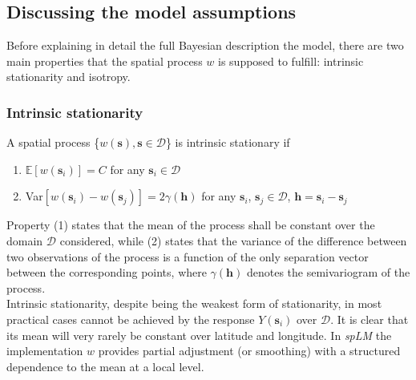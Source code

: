 \documentclass[12pt]{article}
\begin{document}
	\subsection{Discussing the model assumptions}

Before explaining in detail the full Bayesian description the model, there are two main properties that the spatial process $w$ is supposed to fulfill: intrinsic stationarity and isotropy.
	
	\subsubsection{Intrinsic stationarity}
	A spatial process \{$w(\boldsymbol{s}), \boldsymbol{s} \in \mathcal{D}$\} is intrinsic stationary if
	\begin{enumerate}[label=(\arabic*)]
		\item $\mathbb{E}[w(\boldsymbol{s}_i)]=C$ \hspace{5 mm} for any $\boldsymbol{s}_i \in \mathcal{D}$
		\item Var$[w(\boldsymbol{s}_i)-w(\boldsymbol{s}_j)] = 2\gamma(\mathbf{h})$ \hspace{5 mm} for any $\boldsymbol{s}_i$, $\boldsymbol{s}_j \in \mathcal{D}$, $\boldsymbol{h}= \boldsymbol{s}_i-\boldsymbol{s}_j$
	\end{enumerate}
	Property (1) states that the mean of the process shall be constant over the domain $\mathcal{D}$ considered, while (2) states that the variance of the difference between two observations of the process is a function of the only separation vector between the corresponding points, where $\gamma(\boldsymbol{h})$ denotes the semivariogram of the process.\\

\noindent
	Intrinsic stationarity, despite being the weakest form of stationarity, in most practical cases cannot be achieved by the response $Y(\boldsymbol{s}_i)$ over $\mathcal{D}$. It is clear that its mean will very rarely be constant over latitude and longitude. In \emph{spLM} the implementation $w$ provides partial adjustment (or smoothing) with a structured dependence to the mean at a local level.
	
\end{document}
